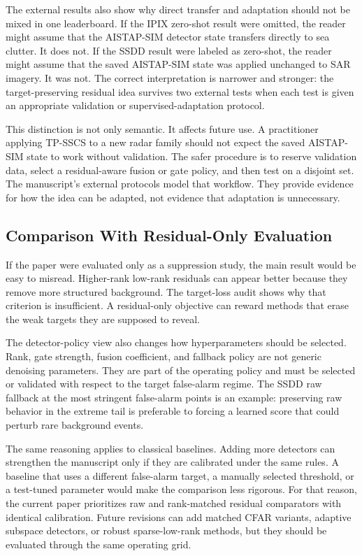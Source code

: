 \documentclass[journal]{IEEEtran}
\begin{document}
The external results also show why direct transfer and adaptation should not be mixed in one leaderboard. If the IPIX zero-shot result were omitted, the reader might assume that the AISTAP-SIM detector state transfers directly to sea clutter. It does not. If the SSDD result were labeled as zero-shot, the reader might assume that the saved AISTAP-SIM state was applied unchanged to SAR imagery. It was not. The correct interpretation is narrower and stronger: the target-preserving residual idea survives two external tests when each test is given an appropriate validation or supervised-adaptation protocol.

This distinction is not only semantic. It affects future use. A practitioner applying TP-SSCS to a new radar family should not expect the saved AISTAP-SIM state to work without validation. The safer procedure is to reserve validation data, select a residual-aware fusion or gate policy, and then test on a disjoint set. The manuscript's external protocols model that workflow. They provide evidence for how the idea can be adapted, not evidence that adaptation is unnecessary.

\subsection{Comparison With Residual-Only Evaluation}

If the paper were evaluated only as a suppression study, the main result would be easy to misread. Higher-rank low-rank residuals can appear better because they remove more structured background. The target-loss audit shows why that criterion is insufficient. A residual-only objective can reward methods that erase the weak targets they are supposed to reveal.

The detector-policy view also changes how hyperparameters should be selected. Rank, gate strength, fusion coefficient, and fallback policy are not generic denoising parameters. They are part of the operating policy and must be selected or validated with respect to the target false-alarm regime. The SSDD raw fallback at the most stringent false-alarm points is an example: preserving raw behavior in the extreme tail is preferable to forcing a learned score that could perturb rare background events.

The same reasoning applies to classical baselines. Adding more detectors can strengthen the manuscript only if they are calibrated under the same rules. A baseline that uses a different false-alarm target, a manually selected threshold, or a test-tuned parameter would make the comparison less rigorous. For that reason, the current paper prioritizes raw and rank-matched residual comparators with identical calibration. Future revisions can add matched CFAR variants, adaptive subspace detectors, or robust sparse-low-rank methods, but they should be evaluated through the same operating grid.
\end{document}
